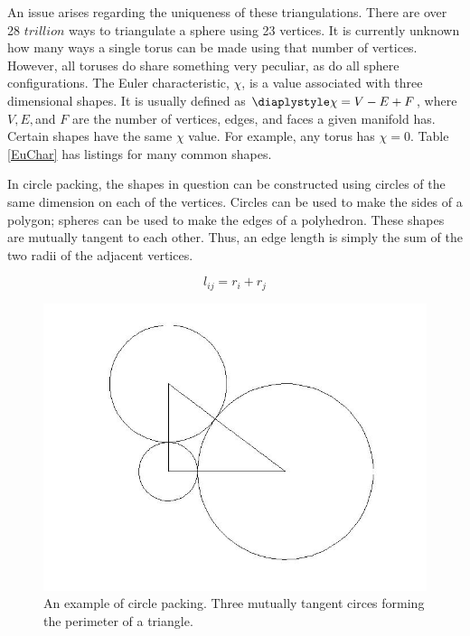 \documentclass[12pt]{article}
\begin{document}
\noindent An issue arises regarding the uniqueness of these triangulations. There are over 28 $trillion$ ways to triangulate a sphere using 23 vertices. It is currently unknown how many ways a single torus can be made using that number of vertices. However, all toruses do share something very peculiar, as do all sphere configurations. The Euler characteristic, $\chi$, is a value associated with three dimensional shapes. It is usually defined as $\diaplystyle\chi = V - E + F$, where $V, E, $and $F$ are the number of vertices, edges, and faces a given manifold has. Certain shapes have the same $\chi$ value. For example, any torus has $\chi = 0$. Table \ref{EuChar} has listings for many common shapes. 

In circle packing, the shapes in question can be constructed using circles of the same dimension on each of the vertices. Circles can be used to make the sides of a polygon; spheres can be used to make the edges of a polyhedron. These shapes are mutually tangent to each other. Thus, an edge length is simply the sum of the two radii of the adjacent vertices.
  
  $$l_{ij} = r_i + r_j$$
  
\begin{figure}
\begin{center}
\includegraphics[scale = 0.3]{righttriangulation.jpg}
\end{center}
\caption{An example of circle packing. Three mutually tangent circes forming the perimeter of a triangle.}
\end{figure}
\end{document}
